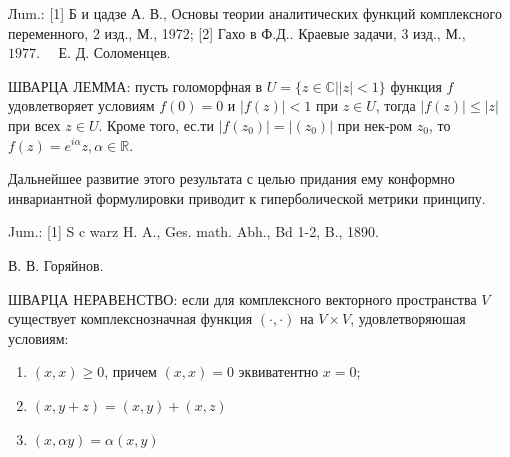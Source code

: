 \documentclass[10pt]{article}
\begin{document}
Лum.: [1] Б и цадзе А. В., Основы теории аналитических функций комплексного переменного, 2 изд., М., 1972; [2] Гахо в Ф.Д.. Краевые задачи, 3 изд., М., $1977 . \quad$ Е. Д. Соломенцев.



ШВАРЦА ЛЕММА: пусть голоморфная в $U=\{z \in \mathbb{C}|| z \mid<1\}$ функция $f$ удовлетворяет условиям $f(0)=0$ и $|f(z)|<1$ при $z \in U$, тогда $|f(z)| \leqslant|z|$ при всех $z \in U$. Кроме того, ес.ти $\left|f\left(z_{0}\right)\right|=\left|\left(z_{0}\right)\right|$ при нек-ром $z_{0}$, то $f(z)=e^{i \alpha} z, \alpha \in \mathbb{R}$.



Дальнейшее развитие этого результата с целью придания ему конформно инвариантной формулировки приводит к гиперболической метрики принципу.



Jum.: [1] S c warz H. A., Ges. math. Abh., Bd 1-2, B., 1890.



В. В. Горяйнов.



ШВАРЦА НЕРАВЕНСТВО: если для комплексного векторного пространства $V$ существует комплекснозначная функция $(\cdot, \cdot)$ на $V \times V$, удовлетворяюшая условиям:



\begin{enumerate}

  \item $(x, x) \geqslant 0$, причем $(x, x)=0$ эквиватентно $x=0$;



  \item $(x, y+z)=(x, y)+(x, z)$



  \item $(x, \alpha y)=\alpha(x, y)$



\end{enumerate}
\end{document}
